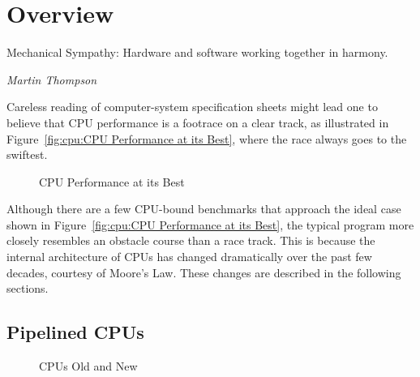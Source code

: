 
\section{Overview}
\label{sec:cpu:Overview}
%
\epigraph{Mechanical Sympathy: Hardware and software working together in
	  harmony.}{\emph{Martin Thompson}}

Careless reading of computer-system specification sheets might lead one
to believe that CPU performance is a footrace on a clear track, as
illustrated in Figure~\ref{fig:cpu:CPU Performance at its Best},
where the race always goes to the swiftest.

\begin{figure}[htb]
\centering
{}
\caption{CPU Performance at its Best}
\end{figure}

Although there are a few CPU-bound benchmarks that approach the ideal case
shown in Figure~\ref{fig:cpu:CPU Performance at its Best},
the typical program more closely resembles an obstacle course than
a race track.
This is because the internal architecture of CPUs has changed dramatically
over the past few decades, courtesy of Moore's Law.
These changes are described in the following sections.

\subsection{Pipelined CPUs}
\label{sec:cpu:Pipelined CPUs}

\begin{figure}[tb]
\centering
{}
\caption{CPUs Old and New}
\end{figure}

